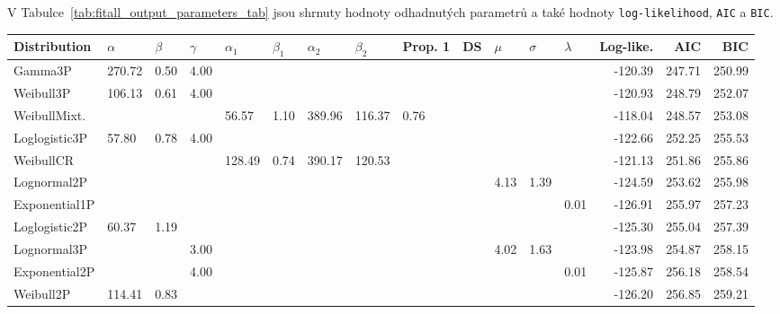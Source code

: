\documentclass[a4, 11pt]{article}
\theoremstyle{definition}
\theoremstyle{remark}
\begin{document}
	V Tabulce~\ref{tab:fitall_output_parameters_tab} jsou shrnuty hodnoty odhadnutých parametrů a také hodnoty \texttt{log-likelihood}, \texttt{AIC} a \texttt{BIC}.
	
\begin{table}[H]
	\tiny
	\centering
	\begin{tabular}{@{}|l|l|l|l|l|l|l|l|l|l|l|l|l|r|r|r|@{}}
		\toprule
		\textbf{Distribution} &
		$\alpha$ &
		$\beta$ &
		$\gamma$ &
		$\alpha_1$ &
		$\beta_1$ &
		$\alpha_2$ &
		$\beta_2$ &
		Prop. 1 &
		DS &
		$\mu$ &
		$\sigma$ &
		$\lambda$ &
		\textbf{Log-like.} &
		\textbf{AIC} &
		\textbf{BIC} \\ \toprule
		Gamma3P       & 270.72 & 0.50 & 4.00 &        &      &        &        &      &      &        &        &      & -120.39 & 247.71 & 250.99 \\ \midrule
		Weibull3P     & 106.13 & 0.61 & 4.00 &        &      &        &        &      &      &        &        &      & -120.93 & 248.79 & 252.07 \\ \midrule
		WeibullMixt.  &        &      &      & 56.57  & 1.10 & 389.96 & 116.37 & 0.76 &      &        &        &      & -118.04 & 248.57 & 253.08 \\ \midrule
		Loglogistic3P & 57.80  & 0.78 & 4.00 &        &      &        &        &      &      &        &        &      & -122.66 & 252.25 & 255.53 \\ \midrule
		WeibullCR     &        &      &      & 128.49 & 0.74 & 390.17 & 120.53 &      &      &        &        &      & -121.13 & 251.86 & 255.86 \\ \midrule
		Lognormal2P   &        &      &      &        &      &        &        &      &      & 4.13   & 1.39   &      & -124.59 & 253.62 & 255.98 \\ \midrule
		Exponential1P &        &      &      &        &      &        &        &      &      &        &        & 0.01 & -126.91 & 255.97 & 257.23 \\ \midrule
		Loglogistic2P & 60.37  & 1.19 &      &        &      &        &        &      &      &        &        &      & -125.30 & 255.04 & 257.39 \\ \midrule
		Lognormal3P   &        &      & 3.00 &        &      &        &        &      &      & 4.02   & 1.63   &      & -123.98 & 254.87 & 258.15 \\ \midrule
		Exponential2P &        &      & 4.00 &        &      &        &        &      &      &        &        & 0.01 & -125.87 & 256.18 & 258.54 \\ \midrule
		Weibull2P     & 114.41 & 0.83 &      &        &      &        &        &      &      &        &        &      & -126.20 & 256.85 & 259.21 \\ \midrule

\end{tabular}
\end{table}
\end{document}
